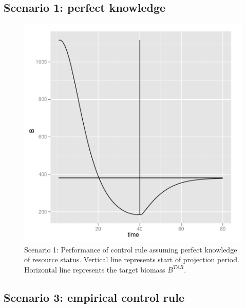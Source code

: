 \documentclass[a4paper]{article}
\begin{document}
\subsection{Scenario 1: perfect knowledge}


\begin{figure}
\centering
\includegraphics{script-hcr_plot_sc1}
\caption{Scenario 1: Performance of control rule assuming perfect knowledge of resource status. Vertical line represents start of projection period. 
Horizontal line represents the target biomass $B^{TAR}$.}
\label{fig:hcr_proj_biomass}
\end{figure}

\subsection{Scenario 3: empirical control rule}
\end{document}
